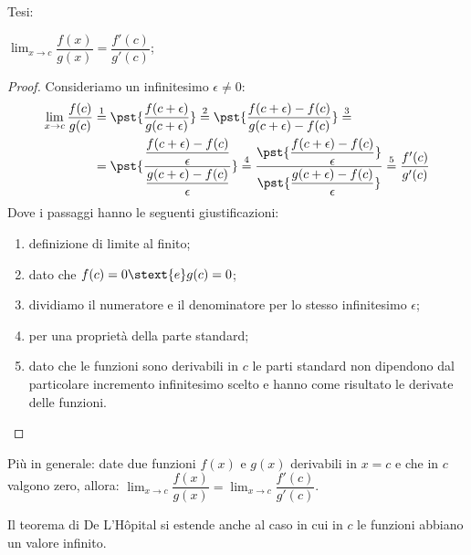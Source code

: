 \noindent Tesi: 

\(\displaystyle \lim_{x \to c}\dfrac{f(x)}{g(x)} = 
  \dfrac{f'(c)}{g'(c)}\); 

\begin{proof}
Consideriamo un infinitesimo \(\epsilon \neq 0\):
\begin{align*}
\lim_{x \to c} \dfrac{f(c)}{g(c)} &\stackrel{1}{=}
\pst{\dfrac{f(c+\epsilon)}{g(c+\epsilon)}}\stackrel{2}{=}
\pst{\dfrac{f(c+\epsilon) - f(c)}{g(c+\epsilon) - f(c)}}\stackrel{3}{=} \\
&=\pst{\dfrac{\dfrac{f(c+\epsilon) - f(c)}{\epsilon}}
             {\dfrac{g(c+\epsilon) - f(c)}{\epsilon}}}\stackrel{4}{=}
\dfrac{\pst{\dfrac{f(c+\epsilon) - f(c)}{\epsilon}}}
        {\pst{\dfrac{g(c+\epsilon) - f(c)}{\epsilon}}}\stackrel{5}{=} 
\dfrac{f'(c)}{g'(c)}
\end{align*}
Dove i passaggi hanno le seguenti giustificazioni:
\begin{enumerate} [nosep]
\item definizione di limite al finito;
\item dato che \(f(c) = 0 \stext{e} g(c) = 0\);
\item dividiamo il numeratore e il denominatore per lo stesso infinitesimo 
\(\epsilon\);
\item per una proprietà della parte standard;
\item dato che le funzioni sono derivabili in \(c\) le parti 
standard non dipendono dal particolare incremento infinitesimo scelto e 
hanno come risultato le derivate delle funzioni.
\end{enumerate}
\end{proof}

Più in generale: 
date due funzioni \(f(x)\) e \(g(x)\) derivabili in \(x = c\) 
e che in \(c\) valgono zero, allora: \quad 
\(\displaystyle \lim_{x \to c} \dfrac{f(x)}{g(x)} = 
  \lim_{x \to c} \dfrac{f'(c)}{g'(c)}\).

\bigskip
Il teorema di De L'H\^opital si estende anche al caso in cui in \(c\) le 
funzioni abbiano un valore infinito.

% 








